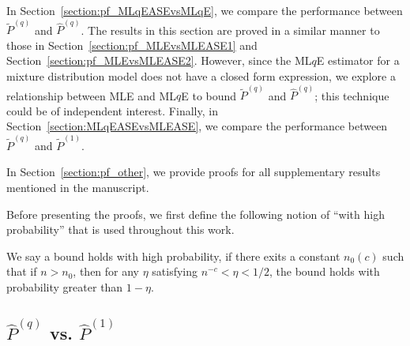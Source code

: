 In Section~\ref{section:pf_MLqEASEvsMLqE}, we compare the performance between $\widetilde{P}^{(q)}$ and $\hat{P}^{(q)}$. The results in this section are proved in a similar manner to those in Section~\ref{section:pf_MLEvsMLEASE1} and Section~\ref{section:pf_MLEvsMLEASE2}. However, since the ML$q$E estimator for a mixture distribution model does not have a closed form expression, we explore a relationship between MLE and ML$q$E to bound $\widetilde{P}^{(q)}$ and $\hat{P}^{(q)}$; this technique could be of independent interest. Finally, in Section~\ref{section:MLqEASEvsMLEASE}, we compare the performance between $\widetilde{P}^{(q)}$ and $\widetilde{P}^{(1)}$.

In Section~\ref{section:pf_other}, we provide proofs for all supplementary results mentioned in the manuscript.

Before presenting the proofs, we first define the following notion of ``with high probability'' that is used throughout this work.
\begin{definition}
We say a bound holds with high probability, if there exits a constant $n_0(c)$ such that if $n > n_0$, then for any $\eta$ satisfying $n^{-c} < \eta < 1/2$, the bound holds with probability greater than $1 - \eta$.
\end{definition}

\subsection{$\hat{P}^{(q)}$ vs. $\hat{P}^{(1)}$}
\label{section:pf_MLqEvsMLE}

